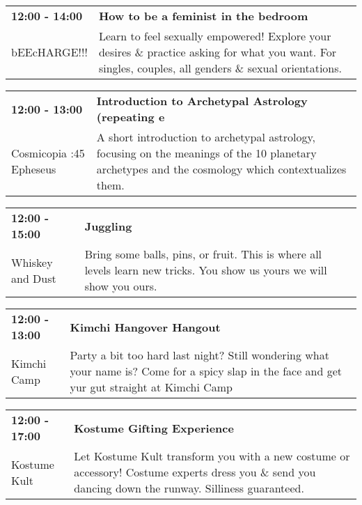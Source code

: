 \begin{tabular}{ p{1in} p{2.2in} }
    \textbf{12:00 - 14:00} & \textbf{How to be a feminist in the bedroom} \\
    bEEcHARGE!!! \newline  & Learn to feel sexually empowered! Explore your desires \& practice asking for what you want. For singles, couples, all genders \& sexual orientations. \\
    \hline 
\end{tabular}
    
\begin{tabular}{ p{1in} p{2.2in} }
    \textbf{12:00 - 13:00} & \textbf{Introduction to Archetypal Astrology (repeating e} \\
    Cosmicopia \newline 3:45 Epheseus & A short introduction to archetypal astrology, focusing on the meanings of the 10 planetary archetypes and the cosmology which contextualizes them. \\
    \hline 
\end{tabular}
    
\begin{tabular}{ p{1in} p{2.2in} }
    \textbf{12:00 - 15:00} & \textbf{Juggling} \\
    Whiskey and Dust \newline  & Bring some balls, pins, or fruit. This is where all levels learn new tricks. You show us yours we will show you ours. \\
    \hline 
\end{tabular}
    
\begin{tabular}{ p{1in} p{2.2in} }
    \textbf{12:00 - 13:00} & \textbf{Kimchi Hangover Hangout} \\
    Kimchi Camp \newline  & Party a bit too hard last night? Still wondering what your name is? Come for a spicy slap in the face and get yur gut straight at Kimchi Camp \\
    \hline 
\end{tabular}
    
\begin{tabular}{ p{1in} p{2.2in} }
    \textbf{12:00 - 17:00} & \textbf{Kostume Gifting Experience} \\
    Kostume Kult \newline  & Let Kostume Kult transform you with a new costume or accessory! Costume experts dress you \& send you dancing down the runway. Silliness guaranteed. \\
    \hline 
\end{tabular}
    
